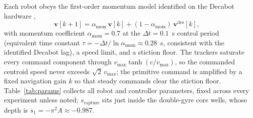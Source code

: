\documentclass[lettersize,journal]{IEEEtran}
\begin{document}
Each robot obeys the first-order momentum model identified on the
Decabot hardware \cite{14},
\begin{equation}
    \mathbf{v}[k+1] = \alpha_{\text{mom}}\,\mathbf{v}[k]
    + (1 - \alpha_{\text{mom}})\,\mathbf{v}^{\text{des}}[k],
    \label{eq:momentum}
\end{equation}
with momentum coefficient $\alpha_{\text{mom}} = 0.7$ at the
$\Delta t = 0.1$~s control period (equivalent time constant $\tau =
-\Delta t/\ln\alpha_{\text{mom}} \approx 0.28$~s, consistent with the
identified Decabot lag), a speed limit, and a stiction floor.
The trackers saturate every command component through
$v_{\max}\tanh(c/v_{\max})$, so the commanded centroid speed never
exceeds $\sqrt{2}\,v_{\max}$; the primitive command is amplified by a
fixed navigation gain $k$ so that steady commands clear the stiction
floor. Table~\ref{tab:params} collects all robot and controller
parameters, fixed across every experiment unless noted;
$s_{\text{capture}}$ sits just inside the double-gyre core wells, whose
depth is $s_1 = -\pi^2 A \approx -0.987$.
\end{document}

